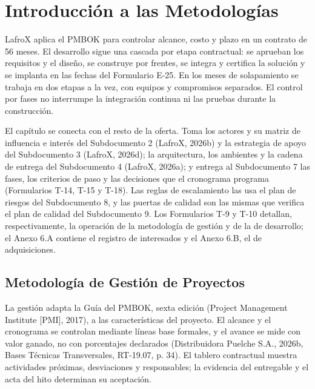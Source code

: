 \setcounter{chapter}{5}
\chapter{Introducción a las Metodologías}
\label{cap:metodologias}

LafroX aplica el PMBOK para controlar alcance, costo y plazo en un contrato de 56 meses. El desarrollo sigue una cascada por etapa contractual: se aprueban los requisitos y el diseño, se construye por frentes, se integra y certifica la solución y se implanta en las fechas del Formulario E-25. En los meses de solapamiento se trabaja en dos etapas a la vez, con equipos y compromisos separados. El control por fases no interrumpe la integración continua ni las pruebas durante la construcción.

El capítulo se conecta con el resto de la oferta. Toma los actores y su matriz de influencia e interés del Subdocumento 2 (LafroX, 2026b) y la estrategia de apoyo del Subdocumento 3 (LafroX, 2026d); la arquitectura, los ambientes y la cadena de entrega del Subdocumento 4 (LafroX, 2026a); y entrega al Subdocumento 7 las fases, los criterios de paso y las decisiones que el cronograma programa (Formularios T-14, T-15 y T-18). Las reglas de escalamiento las usa el plan de riesgos del Subdocumento 8, y las puertas de calidad son las mismas que verifica el plan de calidad del Subdocumento 9. Los Formularios T-9 y T-10 detallan, respectivamente, la operación de la metodología de gestión y de la de desarrollo; el Anexo 6.A contiene el registro de interesados y el Anexo 6.B, el de adquisiciones.

\section{Metodología de Gestión de Proyectos}

La gestión adapta la Guía del PMBOK, sexta edición (Project Management Institute [PMI], 2017), a las características del proyecto. El alcance y el cronograma se controlan mediante líneas base formales, y el avance se mide con valor ganado, no con porcentajes declarados (Distribuidora Puelche S.A., 2026b, Bases Técnicas Transversales, RT-19.07, p. 34). El tablero contractual muestra actividades próximas, desviaciones y responsables; la evidencia del entregable y el acta del hito determinan su aceptación.

